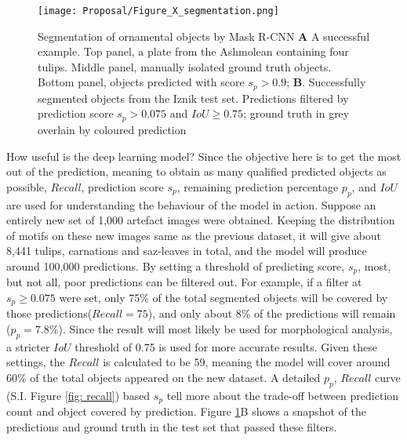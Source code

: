 \documentclass[11pt]{article}
\begin{document}
\begin{figure}[H]
\centering
\texttt{[image: Proposal/Figure\_X\_segmentation.png]}
\caption{Segmentation of ornamental objects by Mask R-CNN \textbf{A} A successful example. Top panel, a plate from the Ashmolean containing four tulips. Middle panel, manually isolated ground truth objects. Bottom panel, objects predicted with score $s_{p} > 0.9$; \textbf{B}. Successfully segmented objects from the Iznik test set. Predictions filtered by prediction score $s_{p}>0.075$ and $IoU \geq 0.75$; ground truth in grey overlain by coloured prediction}
\label{fig:segmented}
\end{figure}
How useful is the deep learning model? Since the objective here is to get the most out of the prediction, meaning to obtain as many qualified predicted objects as possible, $Recall$, prediction score $s_{p}$, remaining prediction percentage $p_{p}$, and $IoU$ are used for understanding the behaviour of the model in action. Suppose an entirely new set of 1,000 artefact images were obtained. Keeping the distribution of motifs on these new images same as the previous dataset, it will give about 8,441 tulips, carnations and saz-leaves in total, and the model will produce around 100,000 predictions. By setting a threshold of predicting score, $s_{p}$, most, but not all, poor predictions can be filtered out. For example, if a filter at $s_{p}\geq0.075$ were set, only 75\% of the total segmented objects will be covered by those predictions($Recall=75$), and only about 8\% of the predictions will remain ($p_{p}=7.8\%$). Since the result will most likely be used for morphological analysis, a stricter $IoU$ threshold of 0.75 is used for more accurate results. Given these settings, the $Recall$ is calculated to be 59, meaning the model will cover around 60\% of the total objects appeared on the new dataset. A detailed $p_{p}$, $Recall$ curve (S.I. Figure \ref{fig: recall}) based $s_{p}$ tell more about the trade-off between prediction count and object covered by prediction. Figure \ref{fig:segmented}B shows a snapshot of the predictions and ground truth in the test set that passed these filters.\par
\end{document}
